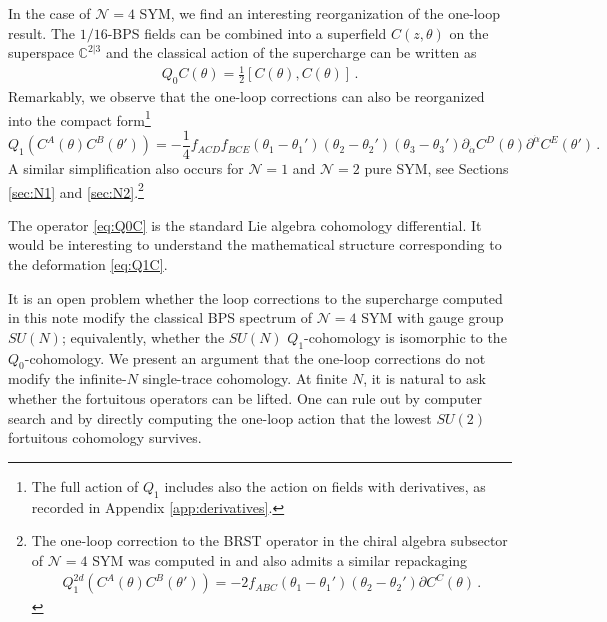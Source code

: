 \documentclass[11pt]{article}
\begin{document}
In the case of $\mathcal{N}=4$ SYM, we find an interesting reorganization of the one-loop result. The $1/16$-BPS fields can be combined into a superfield $C(z,\theta)$ on the superspace $\mathbb{C}^{2|3}$ and the classical action of the supercharge can be written as \cite{Chang:2013fba}
\begin{align}
    Q_0 C(\theta) = \frac{1}{2}[C(\theta),C(\theta)] \, . \label{eq:Q0C}
\end{align}
Remarkably, we observe that the one-loop corrections can also be reorganized into the compact form\footnote{The full action of $Q_1$ includes also the action on fields with derivatives, as recorded in Appendix \ref{app:derivatives}.}
\begin{equation}
    Q_1 (C^A(\theta) C^B(\theta')) = -\frac{1}{4} f_{ACD}f_{BCE}  (\theta_1-\theta_1')(\theta_2-\theta_2')(\theta_3-\theta_3') \partial_{\dot\alpha} C^D(\theta) \partial^{\dot\alpha} C^E(\theta')\,. \label{eq:Q1C}
\end{equation} 
A similar simplification also occurs for $\mathcal{N}=1$ and $\mathcal{N}=2$ pure SYM, see Sections \ref{sec:N1} and \ref{sec:N2}.\footnote{The one-loop correction to the BRST operator in the chiral algebra subsector of $\mathcal{N}=4$ SYM \cite{Beem:2013sza} was computed in \cite{Chang:2023ywj} and also admits a similar repackaging
    \begin{align}
        Q_1^{2d} (C^A(\theta)C^B(\theta')) = -2 f_{ABC} (\theta_1-\theta_1')(\theta_2-\theta_2') \partial C^C(\theta) \,.
    \end{align}}

The operator \eqref{eq:Q0C} is the standard Lie algebra cohomology differential. It would be interesting to understand the mathematical structure corresponding to the deformation \eqref{eq:Q1C}.

It is an open problem whether the loop corrections to the supercharge computed in this note modify the classical BPS spectrum of $\mathcal{N}=4$ SYM with gauge group $SU(N)$; equivalently, whether the $SU(N)$ $Q_1$-cohomology is isomorphic to the $Q_0$-cohomology. We present an argument that the one-loop corrections do not modify the infinite-$N$ single-trace cohomology. At finite $N$, it is natural to ask whether the fortuitous operators can be lifted. One can rule out by computer search \cite{Chang:2025mqp} and by directly computing the one-loop action \cite{Budzik:2023vtr} that the lowest $SU(2)$ fortuitous cohomology \cite{Chang:2022mjp, Choi:2022caq} survives.
\end{document}
